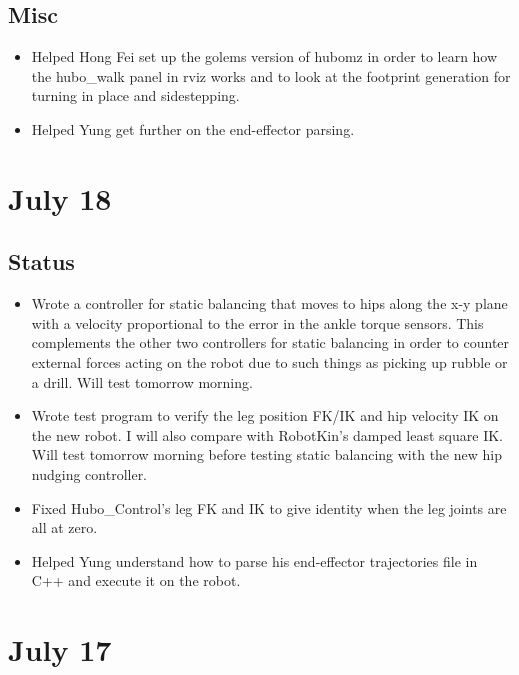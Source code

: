 \documentclass[letterpaper, 10 pt]{report}
\begin{document}
\subsection*{Misc}
\begin{itemize}
\item Helped Hong Fei set up the golems version of hubomz in order to learn how the hubo\_walk panel in rviz works and to look at the footprint generation for turning in place and sidestepping.
\item Helped Yung get further on the end-effector parsing.
\end{itemize}

\section*{July 18}
\subsection*{Status}
\begin{itemize}
\item Wrote a controller for static balancing that moves to hips along the x-y plane with a velocity proportional to the error in the ankle torque sensors. This complements the other two controllers for static balancing in order to counter external forces acting on the robot due to such things as picking up rubble or a drill. Will test tomorrow morning.
\item Wrote test program to verify the leg position FK/IK and hip velocity IK on the new robot. I will also compare with RobotKin's damped least square IK. Will test tomorrow morning before testing static balancing with the new hip nudging controller.
\item Fixed Hubo\_Control's leg FK and IK to give identity when the leg joints are all at zero.
\item Helped Yung understand how to parse his end-effector trajectories file in C++ and execute it on the robot.
\end{itemize}

\section*{July 17}
\end{document}
